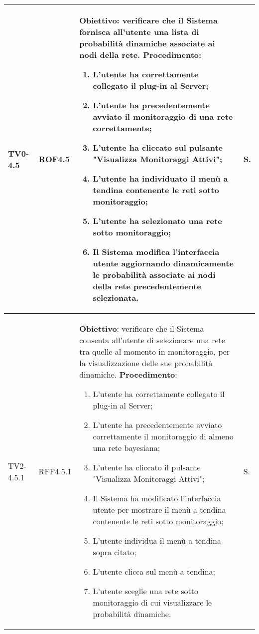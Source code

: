 \begin{longtable}{|C{.15\textwidth}|C{.13\textwidth}|m{.65\textwidth}|C{.08\textwidth}|}
TV0-4.5 & ROF4.5 &
	\textbf{Obiettivo}: verificare che il Sistema fornisca all'utente una lista di probabilità dinamiche associate ai nodi della rete. \newline
	\textbf{Procedimento}:
	\begin{enumerate}	
		\item L'utente ha correttamente collegato il plug-in al Server;
		\item L'utente ha precedentemente avviato il monitoraggio di una rete correttamente;
		\item L'utente ha cliccato sul pulsante "Visualizza Monitoraggi Attivi";
		\item L'utente ha individuato il menù a tendina contenente le reti sotto monitoraggio;
		\item L'utente ha selezionato una rete sotto monitoraggio;
		\item Il Sistema modifica l'interfaccia utente aggiornando dinamicamente le probabilità associate ai nodi della rete precedentemente selezionata.
	\end{enumerate}
	& S. \\
\hline

TV2-4.5.1 & RFF4.5.1 &
	\textbf{Obiettivo}: verificare che il Sistema consenta all'utente di selezionare una rete tra quelle al momento in monitoraggio, per la visualizzazione delle sue probabilità dinamiche. \newline
	\textbf{Procedimento}:
	\begin{enumerate}
		\item L'utente ha correttamente collegato il plug-in al Server;
		\item L'utente ha precedentemente avviato correttamente il monitoraggio di almeno una rete bayesiana;
		\item L'utente ha cliccato il pulsante "Visualizza Monitoraggi Attivi";
		\item Il Sistema ha modificato l'interfaccia utente per mostrare il menù a tendina contenente le reti sotto monitoraggio;
		\item L'utente individua il menù a tendina sopra citato;
		\item L'utente clicca sul menù a tendina;
		\item L'utente sceglie una rete sotto monitoraggio di cui visualizzare le probabilità dinamiche.
	\end{enumerate}
	& S. \\
\hline


\end{longtable}
